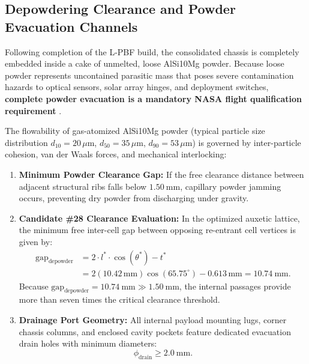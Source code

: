 \subsection{Depowdering Clearance and Powder Evacuation Channels}
Following completion of the L-PBF build, the consolidated chassis is completely embedded inside a cake of unmelted, loose AlSi10Mg powder. Because loose powder represents uncontained parasitic mass that poses severe contamination hazards to optical sensors, solar array hinges, and deployment switches, \textbf{complete powder evacuation is a mandatory NASA flight qualification requirement} \cite{nasa2021}.

The flowability of gas-atomized AlSi10Mg powder (typical particle size distribution $d_{10} = 20\,\mu\text{m}$, $d_{50} = 35\,\mu\text{m}$, $d_{90} = 53\,\mu\text{m}$) is governed by inter-particle cohesion, van der Waals forces, and mechanical interlocking:
\begin{enumerate}
\item \textbf{Minimum Powder Clearance Gap:} If the free clearance distance between adjacent structural ribs falls below $\SI{1.50}{\milli\meter}$, capillary powder jamming occurs, preventing dry powder from discharging under gravity.
\item \textbf{Candidate \#28 Clearance Evaluation:} In the optimized auxetic lattice, the minimum free inter-cell gap between opposing re-entrant cell vertices is given by:
\begin{align}
\text{gap}_{\text{depowder}} &= 2 \cdot l^* \cdot \cos(\theta^*) - t^* \nonumber \\
&= 2(10.42\,\text{mm})\cos(65.75^\circ) - 0.613\,\text{mm} = \SI{10.74}{\milli\meter}.
\label{eq:depowder_clearance}
\end{align}
Because $\text{gap}_{\text{depowder}} = \SI{10.74}{\milli\meter} \gg \SI{1.50}{\milli\meter}$, the internal passages provide more than seven times the critical clearance threshold.
\item \textbf{Drainage Port Geometry:} All internal payload mounting lugs, corner chassis columns, and enclosed cavity pockets feature dedicated evacuation drain holes with minimum diameters:
\begin{equation}
\phi_{\text{drain}} \ge \SI{2.0}{\milli\meter}.
\label{eq:drain_hole_diameter}
\end{equation}
\end{enumerate}

